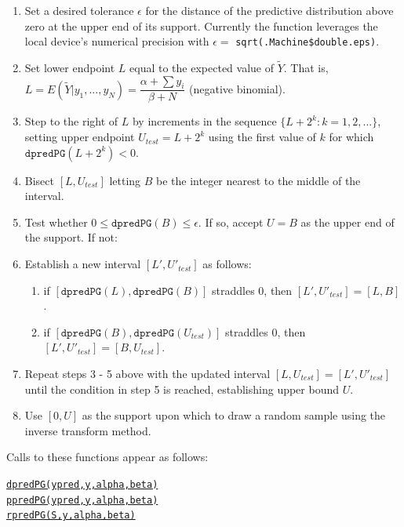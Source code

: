 \documentclass[12pt, a4paper]{article}
\begin{document}
    \begin{enumerate}
      \item Set a desired tolerance $\epsilon$ for the distance of the predictive distribution above zero at the upper end of its support.  Currently the function leverages the local device's numerical precision with $\epsilon = $ \texttt{sqrt(.Machine\$double.eps)}.
      \item Set lower endpoint $L$ equal to the expected value of $\tilde{Y}$.  That is, $L = E(\tilde{Y}|y_1,...,y_N) = \dfrac{\alpha+\sum{y_i}}{\beta+N}$ (negative binomial). %
      \item Step to the right of $L$ by increments in the sequence $\{L+2^k:k=1,2,...\}$, setting upper endpoint $U_{test} = L+2^k$ using the first value of $k$ for which $\texttt{dpredPG}\left(L + 2^k\right) < 0$.
      \item Bisect $[L,U_{test}]$ letting $B$ be the integer nearest to the middle of the interval.
      \item Test whether $0 \leq \texttt{dpredPG}(B) \leq \epsilon$.  If so, accept $U = B$ as the upper end of the support.  If not:
      \item Establish a new interval $[L',U'_{test}]$ as follows:
      \begin{enumerate}
        \item if $[\texttt{dpredPG}(L),\texttt{dpredPG}(B)]$ straddles $0$, then $[L',U'_{test}] = [L,B]$.
        \item if $[\texttt{dpredPG}(B),\texttt{dpredPG}(U_{test})]$ straddles $0$, then $[L',U'_{test}] = [B,U_{test}]$.
      \end{enumerate}
      \item Repeat steps 3 - 5 above with the updated interval $[L,U_{test}] = [L',U'_{test}]$ until the condition in step 5 is reached, establishing upper bound $U$.
      \item Use $[0,U]$ as the support upon which to draw a random sample using the inverse transform method.
    \end{enumerate}


\noindent Calls to these functions appear as follows:

\begin{center}
  \texttt{\hyperref[sec:dpredPG]{dpredPG(ypred,y,alpha,beta)}}\\
  \texttt{\hyperref[sec:ppredPG]{ppredPG(ypred,y,alpha,beta)}}\\
  \texttt{\hyperref[sec:rpredPG]{rpredPG(S,y,alpha,beta)}}\\
\end{center}
\end{document}
